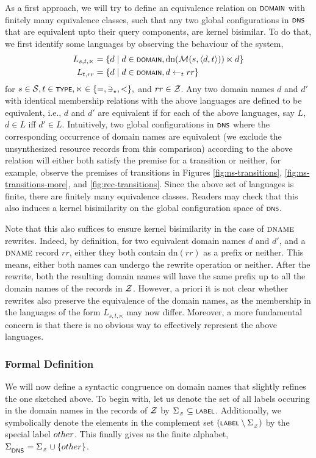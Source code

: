 As a first approach, we will try to define an equivalence relation on $\scrsf{domain}$ with finitely many equivalence classes, such that any two global configurations in $\scrsf{dns}$ that are equivalent upto their query components, are kernel bisimilar. To do that, we first identify some languages by observing the behaviour of the system,
\begin{align*}
	L_{s, t, \ltimes} &= \{d \mid d\in\scrsf{domain},\text{dn}(\cal M (s,\tup{d,t})) \ltimes d\}\\
	L_{t, rr} &= \{d \mid d\in \scrsf{domain}, d \leftarrow_{t} rr\}
\end{align*}
for $s \in \cal S, t \in \scrsf{type}, \ltimes \in \{=,\ni_{\star},<\},$ and $rr\in \cal Z$. Any two domain names $d$ and $d'$ with identical membership relations with the above languages are defined to be equivalent, i.e., $d$ and $d'$ are equivalent if for each of the above languages, say $L$, $d\in L$ iff $d'\in L$. Intuitively, two global configurations in $\scrsf{dns}$ where the corresponding occurrence of domain names are equivalent (we exclude the unsynthesized resource records from this comparison) according to the above relation will either both satisfy the premise for a transition or neither, for example, observe the premises of transitions in Figures \ref{fig:ns-transitions}, \ref{fig:ns-transitions-more}, and \ref{fig:rec-transitions}. Since the above set of languages is finite, there are finitely many equivalence classes. Readers may check that this also induces a kernel bisimilarity on the global configuration space of $\scrsf{dns}$.

Note that this also suffices to ensure kernel bisimilarity in the case of $\rtype{DNAME}$ rewrites. Indeed, by definition, for two equivalent domain names $d$ and $d'$, and a $\rtype{DNAME}$ record $rr$, either they both contain $\text{dn}(rr)$ as a prefix or neither. This means, either both names can undergo the rewrite operation or neither. After the rewrite, both the resulting domain names will have the same prefix up to all the domain names of the records in $\cal Z$. However, a priori it is not clear whether rewrites also preserve the equivalence of the domain names, as the membership in the languages of the form $L_{s,t,\ltimes}$ may now differ. Moreover, a more fundamental concern is that there is no obvious way to effectively represent the above languages.

\subsubsection{Formal Definition}
We will now define a syntactic congruence on domain names that slightly refines the one sketched above. To begin with, let us denote the set of all labels occuring in the domain names in the records of $\cal Z$ by $\zoneAlph\subseteq\scrsf{label}$. Additionally, we symbolically denote the elements in the complement set $(\scrsf{label}\setminus\zoneAlph)$ by the special label $\zoneAlphCompl$. This finally gives us the finite alphabet, $\dnsAlph = \zoneAlph\cup\{\zoneAlphCompl\}$.




